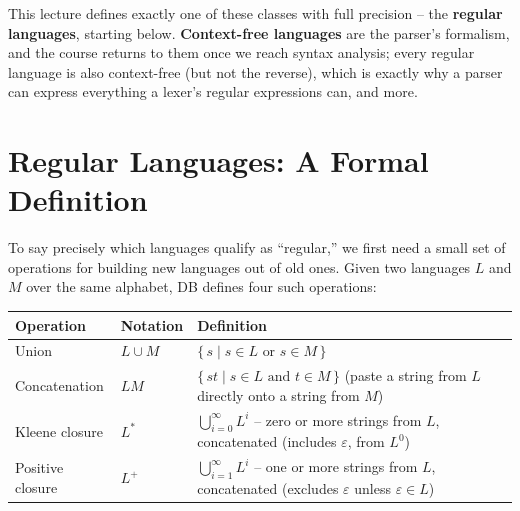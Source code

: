 \documentclass[full-course-notes.tex]{subfiles}
\begin{document}
This lecture defines exactly one of these classes with full precision -- the \textbf{regular
languages}, starting below. \textbf{Context-free languages} are the parser's formalism, and the
course returns to them once we reach syntax analysis; every regular language is also
context-free (but not the reverse), which is exactly why a parser can express everything a
lexer's regular expressions can, and more.

\section{Regular Languages: A Formal Definition}
\label{sec:l3-regular-languages-formal}

\dbtag To say precisely which languages qualify as ``regular,'' we first need a small set of
operations for building new languages out of old ones. Given two languages $L$ and $M$ over the
same alphabet, DB defines four such operations:

\begin{center}
\renewcommand{\arraystretch}{1.35}
\begin{tabularx}{\textwidth}{@{}l l X@{}}
\toprule
\textbf{Operation} & \textbf{Notation} & \textbf{Definition} \\
\midrule
Union & $L \cup M$ & $\{\, s \mid s \in L \text{ or } s \in M \,\}$ \\
Concatenation & $LM$ & $\{\, st \mid s \in L \text{ and } t \in M \,\}$ (paste a string from $L$
directly onto a string from $M$) \\
Kleene closure & $L^{*}$ & $\bigcup_{i=0}^{\infty} L^{i}$ -- zero or more strings from $L$,
concatenated (includes $\varepsilon$, from $L^0$) \\
Positive closure & $L^{+}$ & $\bigcup_{i=1}^{\infty} L^{i}$ -- one or more strings from $L$,
concatenated (excludes $\varepsilon$ unless $\varepsilon \in L$) \\
\bottomrule
\end{tabularx}
\end{center}
\end{document}

